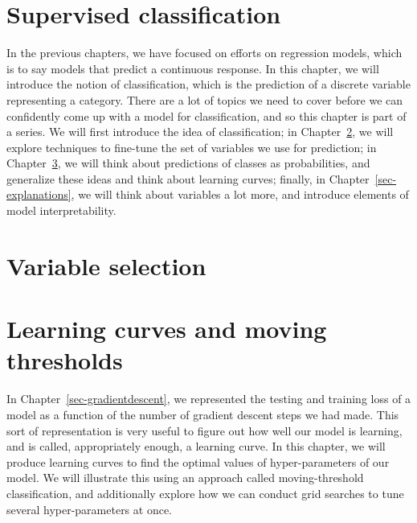 \documentclass[
  letterpaper,
]{scrbook}
\begin{document}

\chapter{Supervised classification}\label{sec-classification}

In the previous chapters, we have focused on efforts on regression
models, which is to say models that predict a continuous response. In
this chapter, we will introduce the notion of classification, which is
the prediction of a discrete variable representing a category. There are
a lot of topics we need to cover before we can confidently come up with
a model for classification, and so this chapter is part of a series. We
will first introduce the idea of classification; in
Chapter~\ref{sec-variable-selection}, we will explore techniques to
fine-tune the set of variables we use for prediction; in
Chapter~\ref{sec-tuning}, we will think about predictions of classes as
probabilities, and generalize these ideas and think about learning
curves; finally, in Chapter~\ref{sec-explanations}, we will think about
variables a lot more, and introduce elements of model interpretability.


\chapter{Variable selection}\label{sec-variable-selection}


\chapter{Learning curves and moving thresholds}\label{sec-tuning}

In Chapter~\ref{sec-gradientdescent}, we represented the testing and
training loss of a model as a function of the number of gradient descent
steps we had made. This sort of representation is very useful to figure
out how well our model is learning, and is called, appropriately enough,
a learning curve. In this chapter, we will produce learning curves to
find the optimal values of hyper-parameters of our model. We will
illustrate this using an approach called moving-threshold
classification, and additionally explore how we can conduct grid
searches to tune several hyper-parameters at once.

\end{document}
